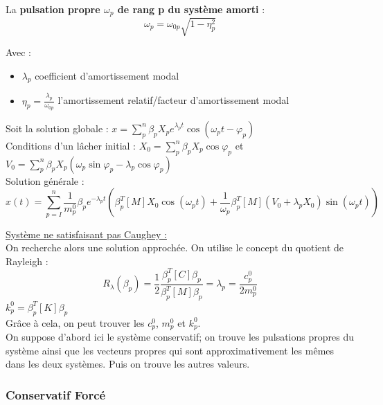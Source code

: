 \documentclass[../main.tex]{subfiles}
\begin{document}
La \textbf{pulsation propre $\omega_p$ de rang p du système amorti} : \begin{equation}
    \omega_p = \omega_{0p} \sqrt{1-\eta_p^2}
\end{equation}

Avec : \begin{itemize}
    \item $\lambda_p$ coefficient d'amortissement modal\\
    \item $\eta_p = \frac{\lambda_p}{\omega_{0p}}$ l'amortissement relatif/facteur d'amortissement modal\\
\end{itemize}

Soit la solution globale : $x = \sum_p^n \beta_p X_p e^{\lambda_p t} \cos(\omega_p t-\varphi_p)$\\

Conditions d'un lâcher initial : $X_0 = \sum_p^n \beta_p X_p \cos\varphi_p$ et $V_0 = \sum_p^n \beta_p X_p (\omega_p \sin \varphi_p - \lambda_p \cos\varphi_p)$\\

Solution générale : \begin{equation}
    x(t) = \sum_{p=I}^n \frac{1}{m_p^0} \beta_p e^{-\lambda_p t} (\beta_p^T [M]X_0 \cos(\omega_p t) + \frac{1}{\omega_p} \beta_p^T [M](V_0 + \lambda_p X_0)\sin(\omega_p t))
\end{equation}

\quad \underline{Système ne satisfaisant pas Caughey :}\\
On recherche alors une solution approchée. On utilise le concept du quotient de Rayleigh : \\
\begin{equation}
    R_\lambda(\beta_p) = \frac{1}{2} \frac{\beta_p^T [C]\beta_p}{\beta_p^T [M]\beta_p} = \lambda_p = \frac{c_p^0}{2 m_p^0}
\end{equation}
$k_p^0 = \beta_p^T [K] \beta_p$\\

Grâce à cela, on peut trouver les $c_p^0$, $m_p^0$ et $k_p^0$.\\
\warning On suppose d'abord ici le système conservatif; on trouve les pulsations propres du système ainsi que les vecteurs propres qui sont approximativement les mêmes dans les deux systèmes. Puis on trouve les autres valeurs.\\

\subsubsection{Conservatif Forcé}
\end{document}

